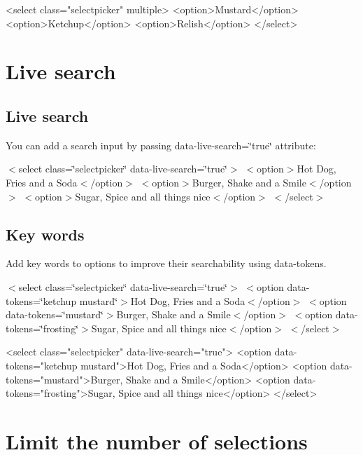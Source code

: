 \begin{DoxyCode}
<select class="selectpicker" multiple>
  <option>Mustard</option>
  <option>Ketchup</option>
  <option>Relish</option>
</select>
\end{DoxyCode}


\section*{Live search}





\subsection*{Live search}

You can add a search input by passing {\ttfamily data-\/live-\/search=\char`\"{}true\char`\"{}} attribute\+:

 $<$select class=\char`\"{}selectpicker\char`\"{} data-\/live-\/search=\char`\"{}true\char`\"{}$>$ $<$option$>$Hot Dog, Fries and a Soda$<$/option$>$ $<$option$>$Burger, Shake and a Smile$<$/option$>$ $<$option$>$Sugar, Spice and all things nice$<$/option$>$ $<$/select$>$ 

\subsection*{Key words}

Add key words to options to improve their searchability using {\ttfamily data-\/tokens}.

 $<$select class=\char`\"{}selectpicker\char`\"{} data-\/live-\/search=\char`\"{}true\char`\"{}$>$ $<$option data-\/tokens=\char`\"{}ketchup mustard\char`\"{}$>$Hot Dog, Fries and a Soda$<$/option$>$ $<$option data-\/tokens=\char`\"{}mustard\char`\"{}$>$Burger, Shake and a Smile$<$/option$>$ $<$option data-\/tokens=\char`\"{}frosting\char`\"{}$>$Sugar, Spice and all things nice$<$/option$>$ $<$/select$>$ 


\begin{DoxyCode}
<select class="selectpicker" data-live-search="true">
  <option data-tokens="ketchup mustard">Hot Dog, Fries and a Soda</option>
  <option data-tokens="mustard">Burger, Shake and a Smile</option>
  <option data-tokens="frosting">Sugar, Spice and all things nice</option>
</select>
\end{DoxyCode}


\section*{Limit the number of selections}

